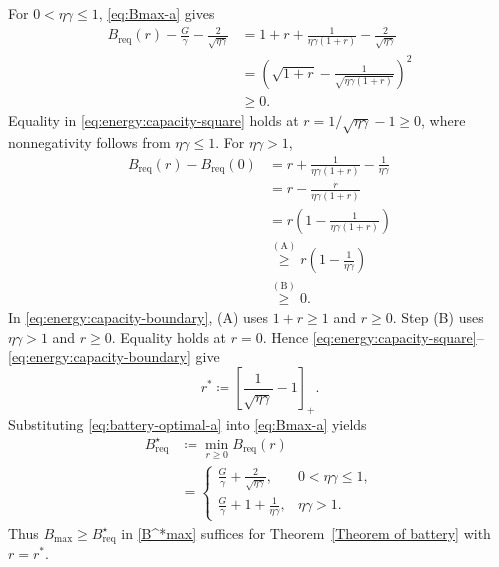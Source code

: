 For $0<\eta\gamma\leq1$, \eqref{eq:Bmax-a} gives
\begin{equation}\label{eq:energy:capacity-square}
\begin{aligned}
 B_{\mathrm{req}}(r)-\frac G\gamma-\frac{2}{\sqrt{\eta\gamma}}
 &=1+r+\frac{1}{\eta\gamma(1+r)}-\frac{2}{\sqrt{\eta\gamma}}\\
 &=\left(\sqrt{1+r}-\frac{1}{\sqrt{\eta\gamma(1+r)}}\right)^2\\
 &\geq0.
\end{aligned}
\end{equation}
Equality in \eqref{eq:energy:capacity-square} holds at
$r=1/\sqrt{\eta\gamma}-1\geq0$,
where nonnegativity follows from $\eta\gamma\leq1$.
For $\eta\gamma>1$,
\begin{equation}\label{eq:energy:capacity-boundary}
\begin{aligned}
 B_{\mathrm{req}}(r)-B_{\mathrm{req}}(0)
 &=r+\frac{1}{\eta\gamma(1+r)}-\frac{1}{\eta\gamma}\\
 &=r-\frac{r}{\eta\gamma(1+r)}\\
 &=r\left(1-\frac{1}{\eta\gamma(1+r)}\right)\\
 &\overset{\mathrm{(A)}}{\geq}r\left(1-\frac{1}{\eta\gamma}\right)\\
 &\overset{\mathrm{(B)}}{\geq}0.
\end{aligned}
\end{equation}
In \eqref{eq:energy:capacity-boundary}, (A) uses $1+r\geq1$ and $r\geq0$.
Step (B) uses $\eta\gamma>1$ and $r\geq0$. Equality holds at $r=0$.
Hence \eqref{eq:energy:capacity-square}--\eqref{eq:energy:capacity-boundary} give
\begin{equation}
\label{eq:battery-optimal-a}
    r^*\coloneqq\left[\frac{1}{\sqrt{\eta\gamma}}-1\right]_+.
\end{equation}
Substituting \eqref{eq:battery-optimal-a} into \eqref{eq:Bmax-a} yields
\begin{equation}
\label{B^*max}
\begin{aligned}
    B_{\mathrm{req}}^\star&\coloneqq\min_{r\geq0}B_{\mathrm{req}}(r)\\
    &=\begin{cases}
       \displaystyle\frac G\gamma+\frac{2}{\sqrt{\eta\gamma}},
       &0<\eta\gamma\leq1,\\[1.2ex]
       \displaystyle\frac G\gamma+1+\frac{1}{\eta\gamma},
       &\eta\gamma>1.
     \end{cases}
\end{aligned}
\end{equation}
Thus $B_{\mathrm{max}}\geq B_{\mathrm{req}}^\star$ in \eqref{B^*max}
suffices for Theorem~\ref{Theorem of battery} with $r=r^*$.

